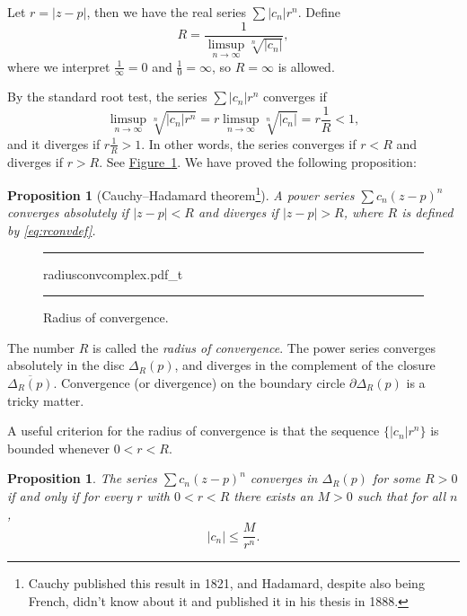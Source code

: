 \documentclass[12pt,openany]{book}
\newcommand{\sabs}[1]{\lvert {#1} \rvert}
\newcommand{\myindex}[1]{#1\index{#1}}
\theoremstyle{plain}
\newtheorem{prop}[thm]{Proposition}
\theoremstyle{remark}
\theoremstyle{definition}
\newenvironment{myfig}{%
\begin{figure}[h!t]
\noindent\rule{\textwidth}{0.4pt}\vspace{12pt}\par\centering}%
{\par\noindent\rule{\textwidth}{0.4pt}
\end{figure}}
\theoremstyle{exercise}
\theoremstyle{example}
\newcommand{\figureref}[1]{\hyperref[#1]{Figure~\ref*{#1}}}
\begin{document}
Let $r = \sabs{z-p}$, then we have the real series $\sum \sabs{c_n} r^n$.  Define
\begin{equation} \label{eq:rconvdef}
R = \frac{1}{\limsup\limits_{n \to \infty} \sqrt[n]{\sabs{c_n}}} ,
\end{equation}
where we interpret $\frac{1}{\infty} = 0$ and $\frac{1}{0} = \infty$,
so $R=\infty$ is allowed.

By the standard root test, the series $\sum \sabs{c_n} r^n$
converges if
\begin{equation*}
\limsup_{n \to \infty} \sqrt[n]{\sabs{c_n} r^n} = 
r \limsup_{n \to \infty} \sqrt[n]{\sabs{c_n}} = r \frac{1}{R} < 1 ,
\end{equation*}
and it diverges if $r \frac{1}{R} > 1$.  In other words,
the series converges if
$r < R$
and diverges if
$r > R$.  See \figureref{fig:radiusconvcomplex}.
We have proved the following proposition:

\begin{prop}[Cauchy--Hadamard theorem\footnote{%
Cauchy published this result in 1821, and Hadamard, despite also being
French, didn't know about it and published it in his thesis in 1888.}]
A power series $\sum c_n {(z-p)}^n$ converges absolutely if
$\sabs{z-p} < R$ and diverges if
$\sabs{z-p} > R$, where $R$ is defined by \eqref{eq:rconvdef}.
\end{prop}

\begin{myfig}
{radiusconvcomplex.pdf_t}
\caption{Radius of convergence.\label{fig:radiusconvcomplex}}
\end{myfig}

The number $R$ is called the \emph{\myindex{radius of convergence}}.
The power series converges absolutely
in the disc $\Delta_R(p)$, and diverges
in the complement of the closure $\overline{\Delta_R(p)}$.
Convergence (or divergence) on the boundary circle $\partial \Delta_R(p)$
is a tricky matter.

A useful criterion for the radius of convergence is that the sequence
$\bigl\{ \sabs{c_n} r^n \bigr\}$ is
bounded whenever $0 < r < R$.

\begin{prop} \label{prop:cnrnbounded}
The series $\sum c_n {(z-p)}^n$ converges in $\Delta_{R}(p)$ for some
$R > 0$ if and only if
for every $r$ with
$0 < r < R$ there exists an $M > 0$ such that for all $n$,
\begin{equation*}
\sabs{c_n} \leq \frac{M}{r^n} .
\end{equation*}
\end{prop}
\end{document}
